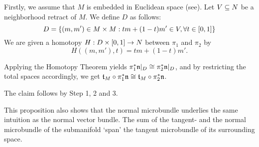 \begin{myproof}
\begin{steps}
Firstly, we assume that $M$ is embedded in Euclidean space (see\cite[p.60]{dimension}). Let $V \subseteq{} N$ be a neighborhood retract of $M$. We define $D$ as follows: \[ D = \{(m, m') \in M \times M: tm + (1 - t)m' \in V, \forall t \in [0, 1]\} \] We are given a homotopy $H: D \times{} [0, 1] \to N$ between $\pi_1$ and $\pi_2$ by \[ H((m, m'), t) = tm + (1 - t)m'. \]

Applying the Homotopy Theorem yields $\pi_1^*\mathfrak{n}\vert_{D} \cong \pi_2^*\mathfrak{n}\vert_{D}$, and by restricting the total spaces accordingly, we get $\mathfrak{t}_M \circ \pi_1^*\mathfrak{n} \cong \mathfrak{t}_M \circ \pi_2^*\mathfrak{n}$. \end{steps} The claim follows by Step 1, 2 and 3. \end{myproof}

\begin{myparagraph} This proposition also shows that the normal microbundle underlies the same intuition as the normal vector bundle. The sum of the tangent- and the normal microbundle of the submanifold `span' the tangent microbundle of its surrounding space. \end{myparagraph}